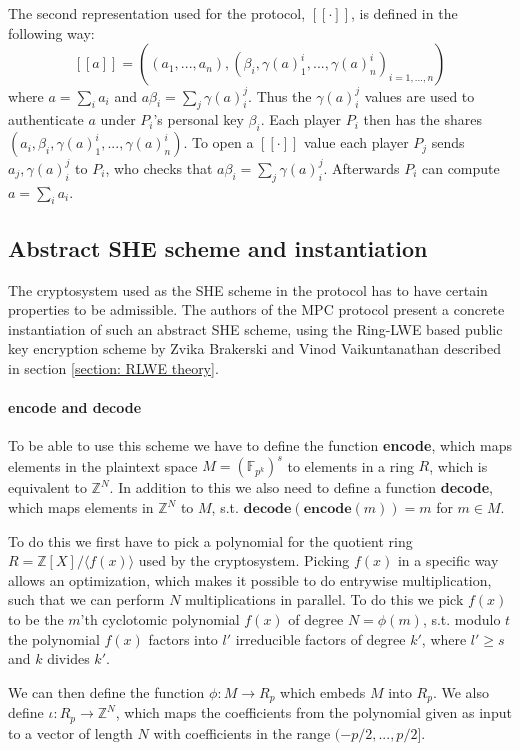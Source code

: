 \documentclass[../main.tex]{subfiles}
\begin{document}
The second representation used for the protocol, $[\![ \cdot ]\!]$, is defined in the following way:
$$[\![ a ]\!] = ((a_1, ..., a_n), (\beta_i, \gamma(a)^i_1, ..., \gamma(a)^i_n)_{i = 1, ..., n})$$
where $a = \sum_i a_i$ and $a\beta_i = \sum_j \gamma(a)^j_i$. Thus the $\gamma(a)^j_i$ values are used to authenticate $a$ under $P_i$'s personal key $\beta_i$. Each player $P_i$ then has the shares $(a_i, \beta_i, \gamma(a)^i_1, ..., \gamma(a)^i_n)$. To open a $[\![ \cdot ]\!]$ value each player $P_j$ sends $a_j, \gamma(a)^j_i$ to $P_i$, who checks that $a\beta_i = \sum_j \gamma(a)^j_i$. Afterwards $P_i$ can compute $a = \sum_i a_i$.

\subsection{Abstract SHE scheme and instantiation}
The cryptosystem used as the SHE scheme in the protocol has to have certain properties to be admissible. The authors of the MPC protocol present a concrete instantiation of such an abstract SHE scheme, using the Ring-LWE based public key encryption scheme by Zvika Brakerski and Vinod Vaikuntanathan \cite{brakerski2011fully} described in section \ref{section: RLWE theory}.

\paragraph{encode and decode}
To be able to use this scheme we have to define the function \textbf{encode}, which maps elements in the plaintext space $M = (\mathbb{F}_{p^k})^s$ to elements in a ring $R$, which is equivalent to $\mathbb{Z}^N$. In addition to this we also need to define a function \textbf{decode}, which maps elements in $\mathbb{Z}^N$ to $M$, s.t. $\textbf{decode}(\textbf{encode}(m)) = m$ for $m \in M$.

To do this we first have to pick a polynomial for the quotient ring $R = \mathbb{Z}[X]/\langle f(x) \rangle$ used by the cryptosystem. Picking $f(x)$ in a specific way allows an optimization, which makes it possible to do entrywise multiplication, such that we can perform $N$ multiplications in parallel.
To do this we pick $f(x)$ to be the $m$'th cyclotomic polynomial $f(x)$ of degree $N = \phi(m)$, s.t. modulo $t$ the polynomial $f(x)$ factors into $l'$ irreducible factors of degree $k'$, where $l' \geq s$ and $k$ divides $k'$.

We can then define the function $\phi: M \rightarrow R_p$ which embeds $M$ into $R_p$. We also define $\iota : R_p \rightarrow \mathbb{Z}^N$, which maps the coefficients from the polynomial given as input to a vector of length $N$ with coefficients in the range $(-p/2, ..., p/2]$.
\end{document}
